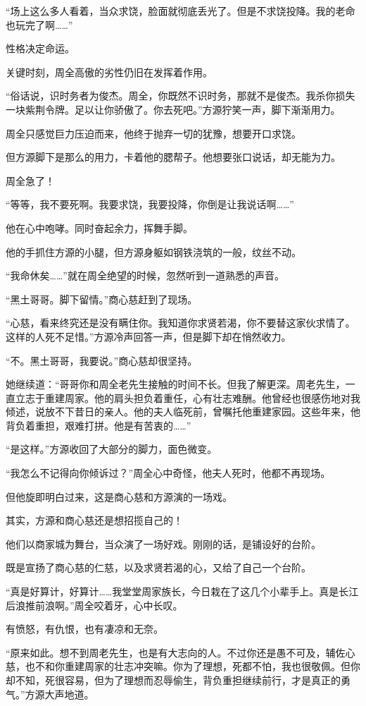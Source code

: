 \begin{this_body}
“场上这么多人看着，当众求饶，脸面就彻底丢光了。但是不求饶投降。我的老命也玩完了啊……”

性格决定命运。

关键时刻，周全高傲的劣性仍旧在发挥着作用。

“俗话说，识时务者为俊杰。周全，你既然不识时务，那就不是俊杰。我杀你损失一块紫荆令牌。足以让你骄傲了。你去死吧。”方源狞笑一声，脚下渐渐用力。

周全只感觉巨力压迫而来，他终于抛弃一切的犹豫，想要开口求饶。

但方源脚下是那么的用力，卡着他的腮帮子。他想要张口说话，却无能为力。

周全急了！

“等等，我不要死啊。我要求饶，我要投降，你倒是让我说话啊……”

他在心中咆哮。同时奋起余力，挥舞手脚。

他的手抓住方源的小腿，但方源身躯如钢铁浇筑的一般，纹丝不动。

“我命休矣……”就在周全绝望的时候，忽然听到一道熟悉的声音。

“黑土哥哥。脚下留情。”商心慈赶到了现场。

“心慈，看来终究还是没有瞒住你。我知道你求贤若渴，你不要替这家伙求情了。这样的人死不足惜。”方源冷声回答一声，但是脚下却在悄然收力。

“不。黑土哥哥，我要说。”商心慈却很坚持。

她继续道：“哥哥你和周全老先生接触的时间不长。但我了解更深。周老先生，一直立志于重建周家。他的肩头担负着重任，心有壮志难酬。他曾经也很感伤地对我倾述，说放不下昔日的亲人。他的夫人临死前，曾嘱托他重建家园。这些年来，他背负着重担，艰难打拼。他是有苦衷的……”

“是这样。”方源收回了大部分的脚力，面色微变。

“我怎么不记得向你倾诉过？”周全心中奇怪，他夫人死时，他都不再现场。

但他旋即明白过来，这是商心慈和方源演的一场戏。

其实，方源和商心慈还是想招揽自己的！

他们以商家城为舞台，当众演了一场好戏。刚刚的话，是铺设好的台阶。

既是宣扬了商心慈的仁慈，以及求贤若渴的心，又给了自己一个台阶。

“真是好算计，好算计……我堂堂周家族长，今日栽在了这几个小辈手上。真是长江后浪推前浪啊。”周全咬着牙，心中长叹。

有愤怒，有仇恨，也有凄凉和无奈。

“原来如此。想不到周老先生，也是有大志向的人。不过你还是愚不可及，辅佐心慈，也不和你重建周家的壮志冲突嘛。你为了理想，死都不怕，我也很敬佩。但你却不知，死很容易，但为了理想而忍辱偷生，背负重担继续前行，才是真正的勇气。”方源大声地道。


\end{this_body}
